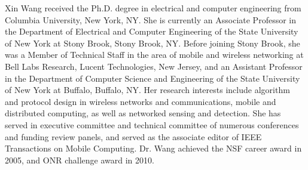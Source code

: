 \begin{IEEEbiography}{Xin Wang}
 received the Ph.D. degree in electrical and computer engineering from Columbia University, New York, NY.
She is currently an Associate Professor in the Department of Electrical and Computer Engineering of the State University of New York at Stony Brook, Stony Brook, NY. Before joining Stony Brook, she was a Member of Technical Staff in the area of mobile and wireless networking at Bell Labs Research, Lucent Technologies, New Jersey, and an Assistant Professor in the Department of Computer Science and Engineering of the State University of New York at Buffalo, Buffalo, NY. Her research interests include algorithm and protocol design in wireless networks and communications, mobile and distributed computing, as well as networked sensing and detection. She has served in executive committee and technical committee of numerous conferences and funding review panels, and served as the associate editor of IEEE Transactions on Mobile Computing. Dr. Wang achieved the NSF career award in 2005, and ONR challenge award in 2010.
\end{IEEEbiography}





